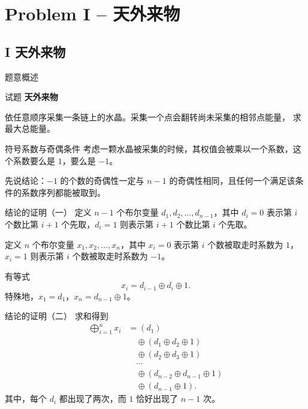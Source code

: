 \documentclass{beamer}
\newcommand{\TT}[1]{{\ttfamily #1}}
\newcommand{\BF}[1]{\textbf{#1}}
\begin{document}
{{\section[I]{Problem I -- 天外来物}
\subsection{I 天外来物}
\begin{frame}{题意概述}
  \begin{center}试题 \myboxix{\BF{\TT{I}}} \BF{天外来物}\end{center}
  依任意顺序采集一条链上的水晶。采集一个点会翻转尚未采集的相邻点能量，
  求最大总能量。
\end{frame}


\begin{frame}{符号系数与奇偶条件}
  考虑一颗水晶被采集的时候，其权值会被乘以一个系数，这个系数要么是 $1$，要么是 $-1$。

  \vspace{0.5em}
  先说结论：$-1$ 的个数的奇偶性一定与 $n-1$ 的奇偶性相同，且任何一个满足该条件的系数序列都能被取到。
\end{frame}

\begin{frame}{结论的证明（一）}
  定义 $n-1$ 个布尔变量 $d_1,d_2,\ldots,d_{n-1}$，其中 $d_i=0$ 表示第 $i$ 个数比第 $i+1$ 个先取，$d_i=1$ 则表示第 $i+1$ 个数比第 $i$ 个先取。

  \vspace{0.5em}
  定义 $n$ 个布尔变量 $x_1,x_2,\ldots,x_n$，其中 $x_i=0$ 表示第 $i$ 个数被取走时系数为 $1$，$x_i=1$ 则表示第 $i$ 个数被取走时系数为 $-1$。

  \vspace{0.5em}
  有等式
  \[
    x_i=d_{i-1}\oplus d_i\oplus 1.
  \]
  特殊地，$x_1=d_1$，$x_n=d_{n-1}\oplus 1$。

\end{frame}

\begin{frame}{结论的证明（二）}
  \vspace{0.5em}
  求和得到
  \[
  \begin{aligned}
    \bigoplus_{i=1}^n x_i &= (d_1)\\
    &\quad \oplus (d_1\oplus d_2\oplus 1)\\
    &\quad \oplus (d_2\oplus d_3\oplus 1)\\
    &\quad \cdots\\
    &\quad \oplus (d_{n-2}\oplus d_{n-1}\oplus 1)\\
    &\quad \oplus (d_{n-1}\oplus 1).
  \end{aligned}
  \]
  其中，每个 $d_i$ 都出现了两次，而 $1$ 恰好出现了 $n-1$ 次。


\end{frame}}}
\end{document}
